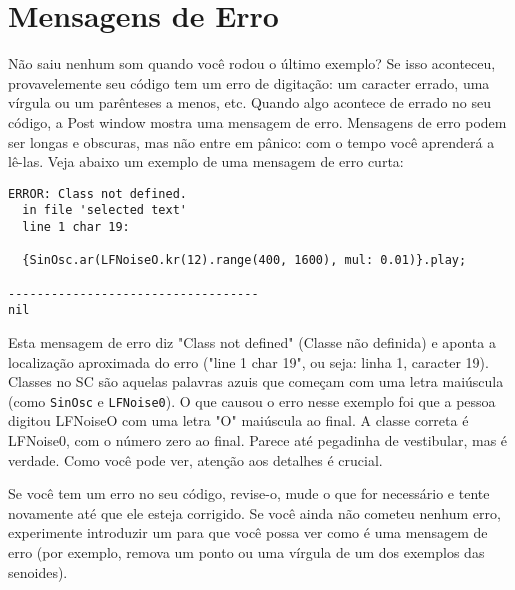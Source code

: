 \section{Mensagens de Erro}

Não saiu nenhum som quando você rodou o último exemplo? Se isso aconteceu, provavelemente seu código tem um erro de digitação: um caracter errado, uma vírgula ou um parênteses a menos, etc. Quando algo acontece de errado no seu código, a Post window mostra uma mensagem de erro. Mensagens de erro podem ser longas e obscuras, mas não entre em pânico: com o tempo você aprenderá a lê-las. Veja abaixo um exemplo de uma mensagem de erro curta:

\begin{verbatim}
ERROR: Class not defined.
  in file 'selected text'
  line 1 char 19:

  {SinOsc.ar(LFNoiseO.kr(12).range(400, 1600), mul: 0.01)}.play; 
                     
-----------------------------------
nil
\end{verbatim}

Esta mensagem de erro diz "Class not defined" (Classe não definida) e aponta a localização aproximada do erro ("line 1 char 19", ou seja: linha 1, caracter 19). Classes no SC são aquelas palavras azuis que começam com uma letra maiúscula (como \texttt{SinOsc} e \texttt{LFNoise0}). O que causou o erro nesse exemplo foi que a pessoa digitou LFNoiseO com uma letra "O" maiúscula ao final. A classe correta é LFNoise0, com o número zero ao final. Parece até pegadinha de vestibular, mas é verdade. Como você pode ver, atenção aos detalhes é crucial.

Se você tem um erro no seu código, revise-o, mude o que for necessário e tente novamente até que ele esteja corrigido. Se você ainda não cometeu nenhum erro, experimente introduzir um para que você possa ver como é uma mensagem de erro (por exemplo, remova um ponto ou uma vírgula de um dos exemplos das senoides).

\bigskip
{}

